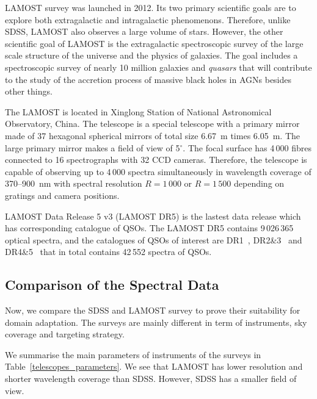 LAMOST survey was launched in 2012.
Its two primary scientific goals are to explore both extragalactic and intragalactic phenomenons.
Therefore, unlike SDSS, LAMOST also observes a large volume of stars.
However, the other scientific goal of LAMOST is the extragalactic spectroscopic survey of the large scale structure of the universe and the physics of galaxies.
The goal includes a spectroscopic survey of nearly 10 million galaxies and \textit{quasars}
that will contribute to the study of the accretion process of massive black holes in AGNs besides other things.~\cite{cui2012}

The LAMOST is located in Xinglong Station of National Astronomical Observatory, China.
The telescope is a special telescope with a primary mirror made of 37 hexagonal spherical mirrors of total size 6.67~m times 6.05~m.
The large primary mirror makes a field of view of 5\(^{\circ}\).
The focal surface has 4\,000 fibres connected to 16 spectrographs with 32 CCD cameras.
Therefore, the telescope is capable of observing up to 4\,000 spectra simultaneously
in wavelength coverage of 370--900~nm with spectral resolution \(R = 1\,000\) or \(R = 1\,500\) depending on gratings and camera positions.~\cite{cui2012}

LAMOST Data Release 5 v3 (LAMOST DR5) is the lastest data release
which has corresponding catalogue of QSOs.
The LAMOST DR5 contains 9\,026\,365 optical spectra,
and the catalogues of QSOs of interest are DR1~\cite{ai2016}, DR2\&3~\cite{dong2018} and DR4\&5~\cite{yao2019}
that in total contains 42\,552 spectra of QSOs.

\subsection{Comparison of the Spectral Data}
\label{comparison}

Now, we compare the SDSS and LAMOST survey to prove their suitability for domain adaptation.
The surveys are mainly different in term of instruments, sky coverage and targeting strategy.

We summarise the main parameters of instruments of the surveys in Table~\ref{telescopes_parameters}.
We see that LAMOST has lower resolution and shorter wavelength coverage than SDSS.
However, SDSS has a smaller field of view.

